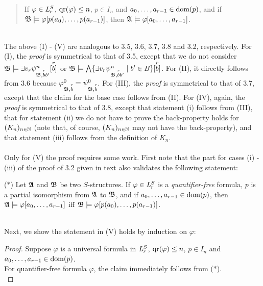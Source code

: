 \begin{enumerate}[1.]
\begin{enumerate}[(a)]
\begin{enumerate}[(I)]
{\begin{quote}
If $\varphi \in \fstordlang[r]{S}$, $\qr{\varphi} \leq n$, $p \in I_n$ and $\seq{a}{r - 1} \in \dom{p}$, and if $\struct{B} \models \varphi[\seqp{p(a_0)}{p(a_{r - 1})}]$, then $\struct{A} \models \varphi[\seq{a}{r - 1}]$.
\end{quote}}
\end{enumerate}
\ \\
The above (I) - (V) are analogous to 3.5, 3.6, 3.7, 3.8 and 3.2, respectively. For (I), the \emph{proof} is symmetrical to that of 3.5, except that we do not consider $\struct{B} \models \exists v_r \psi^n_{\struct{B}, \vect{b}{r}b^\prime}[\vect{b}{r}]$ or $\struct{B} \models \bigwedge\setm{\exists v_r \psi^n_{\struct{B}, \vect{b}{r}b^\prime}}{b^\prime \in B}[\vect{b}{r}]$. For (II), it directly follows from 3.6 because $\varphi^0_{\struct{B}, \vect{b}{r}} = \psi^0_{\struct{B}, \vect{b}{r}}$. For (III), the \emph{proof} is symmetrical to that of 3.7, except that the claim for the base case follows from (II). For (IV), again, the \emph{proof} is symmetrical to that of 3.8, except that statement (i) follows from (III), that for statement (ii) we do not have to prove the back-property holds for $(K_n)_{n \in \nat}$ (note that, of course, $(K_n)_{n \in \nat}$ may not have the back-property), and that statement (iii) follows from the definition of $K_n$.\\
\ \\
Only for (V) the proof requires some work. First note that the part for cases (i) - (iii) of the proof of 3.2 given in text also validates the following statement:\smallskip\\
\begin{bquoteno}{64ex}{($\ast$)}
Let $\struct{A}$ and $\struct{B}$ be two $S$-structures. If $\varphi \in \fstordlang[r]{S}$ is a \emph{quantifier-free} formula, $p$ is a partial isomorphism from $\struct{A}$ to $\struct{B}$, and if $\seq{a}{r - 1} \in \dom{p}$, then\\
$\struct{A} \models \varphi[\seq{a}{r - 1}]$ \quad iff \quad $\struct{B} \models \varphi[\seqp{p(a_0)}{p(a_{r - 1})}]$.
\end{bquoteno}\bigskip\\
Next, we show the statement in (V) holds by induction on $\varphi$:
\begin{proof} Suppose $\varphi$ is a universal formula in $\fstordlang[r]{S}$, $\qr{\varphi} \leq n$, $p \in I_n$ and $\seq{a}{r - 1} \in \dom{p}$.\medskip\\
For quantifier-free formula $\varphi$, the claim immediately follows from ($\ast$).\medskip\\

\end{proof}
\end{enumerate}
\end{enumerate}
